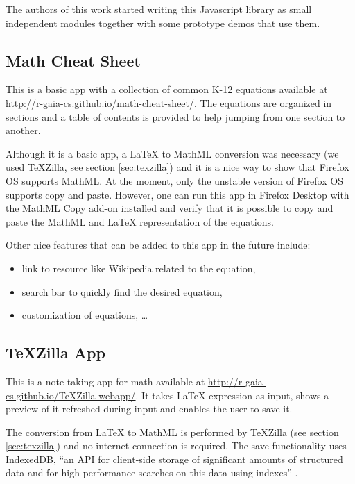 The authors of this work started writing this Javascript library as small
independent modules together with some prototype demos that use them.

\subsection{Math Cheat Sheet}

This is a basic app with a collection of common K-12 equations available at
\href{http://r-gaia-cs.github.io/math-cheat-sheet/}{http://r-gaia-cs.github.io/math-cheat-sheet/}.
The equations are organized in sections and a table of contents is provided to
help jumping from one section to another.

Although it is a basic app, a LaTeX to MathML conversion was necessary
(we used TeXZilla, see section \ref{sec:texzilla})
 and it is a nice way to show that Firefox OS supports
MathML. At the moment, only the unstable version of Firefox OS supports copy
and paste. However, one can run this app in Firefox Desktop with the MathML Copy
add-on installed and verify that it is possible to
copy and paste the MathML and LaTeX representation of the equations.

Other nice features that can be added to this app in the future include:
\begin{itemize}
  \item link to resource like Wikipedia related to the equation,
  \item search bar to quickly find the desired equation,
  \item customization of equations, \ldots
\end{itemize}

\subsection{TeXZilla App}
\label{sec:texzillapp}

This is a note-taking app for math available at
\href{http://r-gaia-cs.github.io/TeXZilla-webapp/}{http://r-gaia-cs.github.io/TeXZilla-webapp/}.
It takes LaTeX expression as input, shows a preview of it refreshed during
input and enables the user to save it.

The conversion from LaTeX to MathML is performed by TeXZilla
(see section \ref{sec:texzilla})
and no internet connection is required. The save functionality
uses IndexedDB, ``an API for client-side storage of significant amounts of
structured data and for high performance searches on this data using indexes''
 \cite{IndexedDatabaseAPI}.

